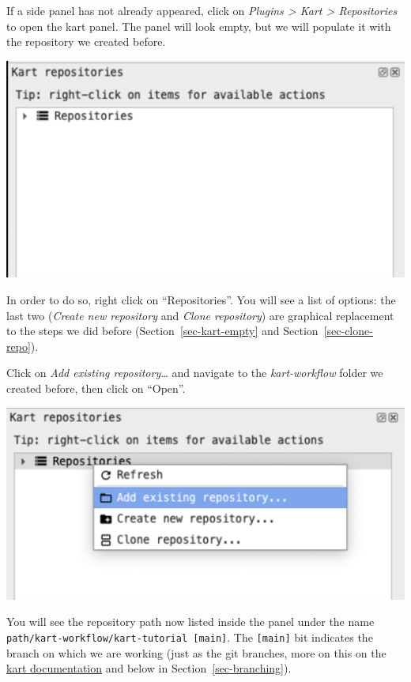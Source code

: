 \documentclass[
  letterpaper,
  DIV=11,
  numbers=noendperiod]{scrartcl}
\begin{document}
If a side panel has not already appeared, click on \emph{Plugins
\textgreater{} Kart \textgreater{} Repositories} to open the kart panel.
The panel will look empty, but we will populate it with the repository
we created before.

\begin{center}
\includegraphics{img/kart-panel.png}
\end{center}

In order to do so, right click on ``Repositories''. You will see a list
of options: the last two (\emph{Create new repository} and \emph{Clone
repository}) are graphical replacement to the steps we did before
(Section~\ref{sec-kart-empty} and Section~\ref{sec-clone-repo}).

Click on \emph{Add existing repository\ldots{}} and navigate to the
\emph{kart-workflow} folder we created before, then click on ``Open''.

\begin{center}
\includegraphics{img/kart-panel-right-click.png}
\end{center}

You will see the repository path now listed inside the panel under the
name \texttt{path/kart-workflow/kart-tutorial\ {[}main{]}}. The
\texttt{{[}main{]}} bit indicates the branch on which we are working
(just as the git branches, more on this on the
\href{https://docs.kartproject.org/en/latest/pages/quick_guide.html\#branching}{kart
documentation} and below in Section~\ref{sec-branching}).
\end{document}
